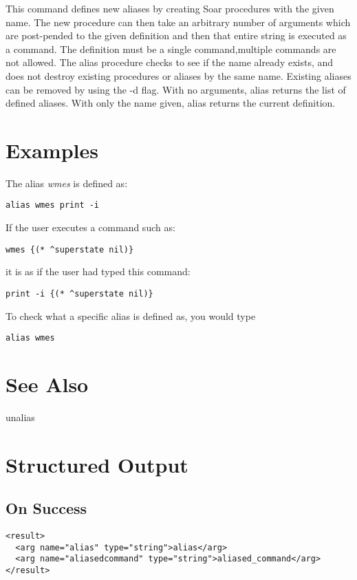 \documentclass[10pt]{article}
\begin{document}
 This command defines new aliases by creating Soar procedures with the given name. The new procedure can then take an arbitrary number of arguments which are post-pended to the given definition and then that entire string is executed as a command. The definition must be a single command,multiple commands are not allowed. The alias procedure checks to see if the name already exists, and does not destroy existing procedures or aliases by the same name. Existing aliases can be removed by using the -d flag. With no arguments, alias returns the list of defined aliases. With only the name given, alias returns the current definition. 
\section*{ Examples }


 The alias \emph{wmes}
 is defined as: \begin{verbatim}
alias wmes print -i

\end{verbatim}



 If the user executes a command such as: \begin{verbatim}
wmes {(* ^superstate nil)}

\end{verbatim}



 it is as if the user had typed this command: \begin{verbatim}
print -i {(* ^superstate nil)}

\end{verbatim}



 To check what a specific alias is defined as, you would type \begin{verbatim}
alias wmes

\end{verbatim}

\section*{ See Also }


 unalias
\section*{ Structured Output }
\subsection*{ On Success }
\begin{verbatim}
<result>
  <arg name="alias" type="string">alias</arg>
  <arg name="aliasedcommand" type="string">aliased_command</arg>
</result>

\end{verbatim}
\end{document}
